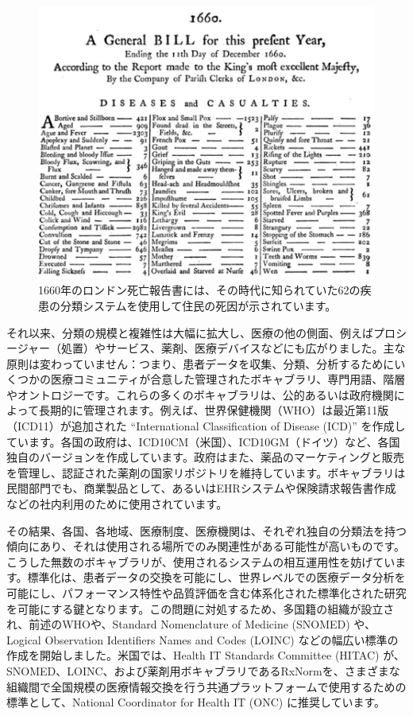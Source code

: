 \documentclass[
  11pt]{book}
\theoremstyle{definition}
\theoremstyle{definition}
\theoremstyle{definition}
\theoremstyle{definition}
\theoremstyle{remark}
\begin{document}
\begin{figure}

{\centering \includegraphics[width=1\linewidth]{images/StandardizedVocabularies/bill} 

}

\caption{1660年のロンドン死亡報告書には、その時代に知られていた62の疾患の分類システムを使用して住民の死因が示されています。}\label{fig:bill}
\end{figure}

それ以来、分類の規模と複雑性は大幅に拡大し、医療の他の側面、例えばプロシージャー（処置）やサービス、薬剤、医療デバイスなどにも広がりました。主な原則は変わっていません：つまり、患者データを収集、分類、分析するためにいくつかの医療コミュニティが合意した管理されたボキャブラリ、専門用語、階層やオントロジーです。これらの多くのボキャブラリは、公的あるいは政府機関によって長期的に管理されます。例えば、世界保健機関（WHO）は最近第11版（ICD11）が追加された ``International Classification of Disease (ICD)'' を作成しています。各国の政府は、ICD10CM（米国）、ICD10GM（ドイツ）など、各国独自のバージョンを作成しています。政府はまた、薬品のマーケティングと販売を管理し、認証された薬剤の国家リポジトリを維持しています。ボキャブラリは民間部門でも、商業製品として、あるいはEHRシステムや保険請求報告書作成などの社内利用のために使用されています。

その結果、各国、各地域、医療制度、医療機関は、それぞれ独自の分類法を持つ傾向にあり、それは使用される場所でのみ関連性がある可能性が高いものです。こうした無数のボキャブラリが、使用されるシステムの相互運用性を妨げています。標準化は、患者データの交換を可能にし、世界レベルでの医療データ分析を可能にし、パフォーマンス特性や品質評価を含む体系化された標準化された研究を可能にする鍵となります。この問題に対処するため、多国籍の組織が設立され、前述のWHOや、Standard Nomenclature of Medicine (SNOMED) や、Logical Observation Identifiers Names and Codes (LOINC) などの幅広い標準の作成を開始しました。米国では、Health IT Standards Committee (HITAC) が、SNOMED、LOINC、および薬剤用ボキャブラリであるRxNormを、さまざまな組織間で全国規模の医療情報交換を行う共通プラットフォームで使用するための標準として、National Coordinator for Health IT (ONC) に推奨しています。
\end{document}
